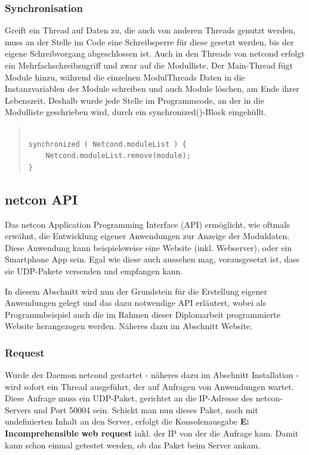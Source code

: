 \documentclass[a4paper,14pt,headsepline]{scrartcl}
\begin{document}
\newpage

\subsubsection*{Synchronisation}

Greift ein Thread auf Daten zu, die auch von anderen Threads genutzt werden, muss an der Stelle im Code eine Schreibsperre für diese gesetzt werden, bis der eigene Schreibvorgang abgeschlossen ist. Auch in den Threads von netcond erfolgt ein Mehrfachschreibzugriff und zwar auf die Modulliste. Der Main-Thread fügt Module hinzu, während die einzelnen ModulThreads Daten in die Instanzvariablen der Module schreiben und auch Module löschen, am Ende ihrer Lebenszeit. Deshalb wurde jede Stelle im Programmcode, an der in die Modulliste geschrieben wird, durch ein synchronized()-Block eingehüllt.    
					
\begin{quote}
\begin{verbatim}

synchronized ( Netcond.moduleList ) {
    Netcond.moduleList.remove(module);
}

\end{verbatim}
\end{quote} 

\newpage

\subsection{netcon API}

Das netcon Application Programming Interface (API) ermöglicht, wie oftmals erwähnt, die Entwicklung eigener Anwendungen zur Anzeige der Moduldaten. Diese Anwendung kann beispielsweise eine Website (inkl. Webserver), oder ein Smartphone App sein. Egal wie diese auch aussehen mag, vorausgesetzt ist, dass sie UDP-Pakete versenden und empfangen kann. 

In diesem Abschnitt wird nun der Grundstein für die Erstellung eigener Anwendungen gelegt und das dazu notwendige API erläutert, wobei als Programmbeispiel auch die im Rahmen dieser Diplomarbeit programmierte Website herangezogen werden. Näheres dazu im Abschnitt Website. 

\subsubsection*{Request}
Wurde der Daemon netcond gestartet - näheres dazu im Abschnitt Installation - wird sofort ein Thread ausgeführt, der auf Anfragen von Anwendungen wartet. Diese Anfrage muss ein UDP-Paket, gerichtet an die IP-Adresse des netcon-Servers und Port 50004 sein. Schickt man nun dieses Paket, noch mit undefinierten Inhalt an den Server, erfolgt die Konsolenausgabe \textbf{E: Incomprehensible web request} inkl. der IP von der die Anfrage kam. Damit kann schon einmal getestet werden, ob das Paket beim Server ankam. 
\end{document}
